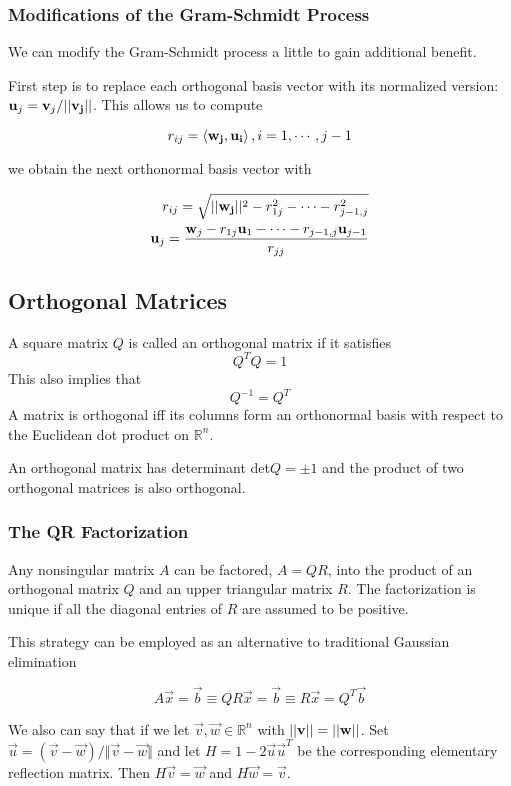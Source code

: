         \subsubsection{Modifications of the Gram-Schmidt Process}
        We can modify the Gram-Schmidt process a little to gain additional benefit.

        First step is to replace each orthogonal basis vector with its normalized version: $\mathbf{u}_j = \mathbf{v}_j / \lvert \lvert \mathbf{v_j} \rvert \rvert$. This allows us to compute

            \[ r_{ij} = \left\langle \mathbf{w_j}, \mathbf{u_i} \right\rangle, i = 1, \cdots, j - 1 \]

        we obtain the next orthonormal basis vector with

            \[ \begin{aligned}
                    r_{ij} = \sqrt{\lvert \lvert \mathbf{w_j} \rvert \rvert^2 - r^2_{1j} - \cdots - r^2_{j-1,j}}\\
                    \mathbf{u}_j = \frac{\mathbf{w}_j - r_{1j}\mathbf{u}_1 - \cdots - r_{j-1, j}\mathbf{u}_{j-1}}{r_{jj}}
                \end{aligned} \]

    \subsection{Orthogonal Matrices}
    A square matrix $Q$ is called an orthogonal matrix if it satisfies
        \[ Q^T Q = 1 \]
    This also implies that
        \[ Q^{-1} = Q^T \]
    A matrix is orthogonal iff its columns form an orthonormal basis with respect to the Euclidean dot product on $\mathbb{R}^n$.

    An orthogonal matrix has determinant det$Q = \pm 1$ and the product of two orthogonal matrices is also orthogonal.

        \subsubsection{The QR Factorization}
        Any nonsingular matrix $A$ can be factored, $A = QR$, into the product of an orthogonal matrix $Q$ and an upper triangular matrix $R$. The factorization is unique if all the diagonal entries of $R$ are assumed to be positive.

        This strategy can be employed as an alternative to traditional Gaussian elimination

        \[ A\vec{x} = \vec{b} \equiv QR\vec{x} = \vec{b} \equiv R\vec{x} = Q^T \vec{b} \]

        We also can say that if we let $\vec{v}, \vec{w} \in \mathbb{R}^n$ with $\lvert \lvert \mathbf{v} \rvert \rvert = \lvert \lvert \mathbf{w} \rvert \rvert$. Set $\vec{u} = (\vec{v} - \vec{w}) / \Vert \vec{v} - \vec{w} \Vert$ and let $H = 1 - 2\vec{u}\vec{u}^T$ be the corresponding elementary reflection matrix. Then $H\vec{v} = \vec{w}$ and $H \vec{w} = \vec{v}$.

